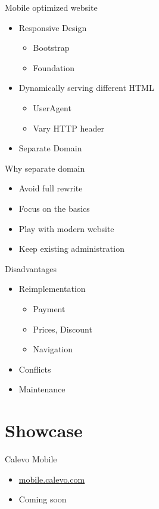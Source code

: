 \begin{frame}{Mobile optimized website}
\begin{itemize}
\item Responsive Design
\begin{itemize}
  \item Bootstrap
  \item Foundation
\end{itemize}
\item Dynamically serving different HTML
\begin{itemize}
  \item UserAgent
  \item Vary HTTP header
\end{itemize}
\item Separate Domain
\end{itemize}
\end{frame}

\begin{frame}{Why separate domain}
\begin{itemize}
\item Avoid full rewrite 
\item Focus on the basics
\item Play with modern website
\item Keep existing administration
\end{itemize}
\end{frame}

\begin{frame}{Disadvantages}
\begin{itemize}
\item Reimplementation
\begin{itemize}
\item Payment
\item Prices, Discount
\item Navigation
\end{itemize}
\item Conflicts
\item Maintenance
\end{itemize}
\end{frame}

\section{Showcase}

\begin{frame}{Calevo Mobile}
\begin{itemize}
\item \url{mobile.calevo.com}
\item Coming soon
\end{itemize}
\end{frame}

